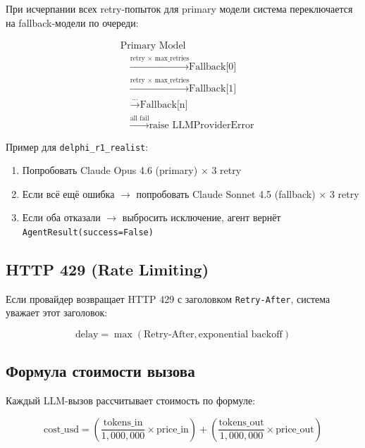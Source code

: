 При исчерпании всех retry-попыток для primary модели система переключается на fallback-модели по очереди:

\begin{equation}
\begin{aligned}
&\text{Primary Model}\\
&\quad \xrightarrow{\text{retry $\times$ max\_retries}} \text{Fallback[0]}\\
&\quad \xrightarrow{\text{retry $\times$ max\_retries}} \text{Fallback[1]}\\
&\quad \xrightarrow{\text{...}} \text{Fallback[n]}\\
&\quad \xrightarrow{\text{all fail}} \text{raise LLMProviderError}
\end{aligned}
\end{equation}

Пример для \texttt{delphi\_r1\_realist}:
\begin{enumerate}[nosep]
\item Попробовать Claude Opus 4.6 (primary) $\times$ 3 retry
\item Если всё ещё ошибка $\to$ попробовать Claude Sonnet 4.5 (fallback) $\times$ 3 retry
\item Если оба отказали $\to$ выбросить исключение, агент вернёт \texttt{AgentResult(success=False)}
\end{enumerate}

\subsection{HTTP 429 (Rate Limiting)}

Если провайдер возвращает HTTP 429 с заголовком \texttt{Retry-After}, система уважает этот заголовок:

\begin{equation}
\text{delay} = \max(\text{Retry-After}, \text{exponential backoff})
\end{equation}

\subsection{Формула стоимости вызова}


Каждый LLM-вызов рассчитывает стоимость по формуле:

\begin{equation}
\text{cost\_usd} = \left(\frac{\text{tokens\_in}}{1{,}000{,}000} \times \text{price\_in}\right) + \left(\frac{\text{tokens\_out}}{1{,}000{,}000} \times \text{price\_out}\right)
\label{eq:llm_cost}
\end{equation}

